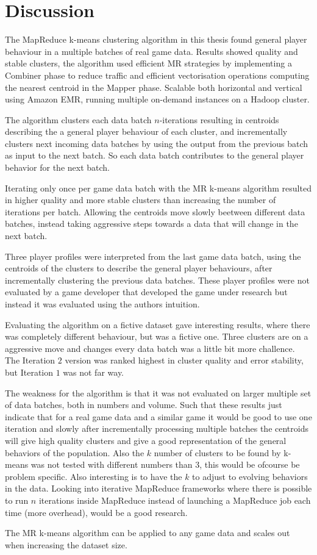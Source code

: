 
\chapter{Discussion} %
\label{Chapter6}

The MapReduce k-means clustering algorithm in this thesis found general player behaviour in a multiple batches of real game data. Results showed quality and stable clusters, the algorithm used efficient MR strategies by implementing a Combiner phase to reduce traffic and efficient vectorisation operations computing the nearest centroid in the Mapper phase. Scalable both horizontal and vertical using Amazon EMR, running multiple on-demand instances on a Hadoop cluster.

The algorithm clusters each data batch $n$-iterations resulting in centroids describing the a general player behaviour of each cluster, and incrementally clusters next incoming data batches by using the output from the previous batch as input to the next batch. So each data batch contributes to the general player behavior for the next batch. 

Iterating only once per game data batch with the MR k-means algorithm resulted in higher quality and more stable clusters than increasing the number of iterations per batch. Allowing the centroids move slowly beetween different data batches, instead taking aggressive steps towards a data that will change in the next batch.

Three player profiles were interpreted from the last game data batch, using the centroids of the clusters to describe the general player behaviours, after incrementally clustering the previous data batches. These player profiles were not evaluated by a game developer that developed the game under research but instead it was evaluated using the authors intuition.

Evaluating the algorithm on a fictive dataset gave interesting results, where there was completely different behaviour, but was a fictive one. Three clusters are on a aggressive move and changes every data batch was a little bit more challence. The Iteration $2$ version was ranked highest in cluster quality and error stability, but Iteration $1$ was not far way. 

The weakness for the algorithm is that it was not evaluated on larger multiple set of data batches, both in numbers and volume. Such that these results just indicate that for a real game data and a similar game it would be good to use one iteration and slowly after incrementally processing multiple batches the centroids will give high quality clusters and give a good representation of the general behaviors of the population. Also the $k$ number of clusters to be found by k-means was not tested with different numbers than $3$, this would be ofcourse be problem specific. Also interesting is to have the $k$ to adjust to evolving behaviors in the data. Looking into iterative MapReduce frameworks where there is possible to run $n$ iterations inside MapReduce instead of launching a MapReduce job each time (more overhead), would be a good research.

The MR k-means algorithm can be applied to any game data and scales out when increasing the dataset size.